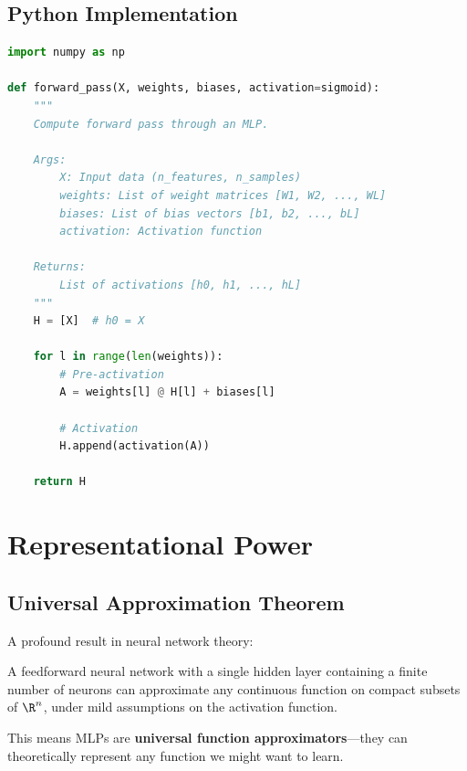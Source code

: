 \subsection{Python Implementation}

\begin{lstlisting}[language=Python, caption=Forward Propagation]
import numpy as np

def forward_pass(X, weights, biases, activation=sigmoid):
    """
    Compute forward pass through an MLP.
    
    Args:
        X: Input data (n_features, n_samples)
        weights: List of weight matrices [W1, W2, ..., WL]
        biases: List of bias vectors [b1, b2, ..., bL]
        activation: Activation function
    
    Returns:
        List of activations [h0, h1, ..., hL]
    """
    H = [X]  # h0 = X
    
    for l in range(len(weights)):
        # Pre-activation
        A = weights[l] @ H[l] + biases[l]
        
        # Activation
        H.append(activation(A))
    
    return H
\end{lstlisting}


\section{Representational Power}

\subsection{Universal Approximation Theorem}

A profound result in neural network theory:

\begin{theorembox}
A feedforward neural network with a single hidden layer containing a finite number of neurons can approximate any continuous function on compact subsets of $\R^n$, under mild assumptions on the activation function.
\end{theorembox}

This means MLPs are \textbf{universal function approximators}---they can theoretically represent any function we might want to learn.

